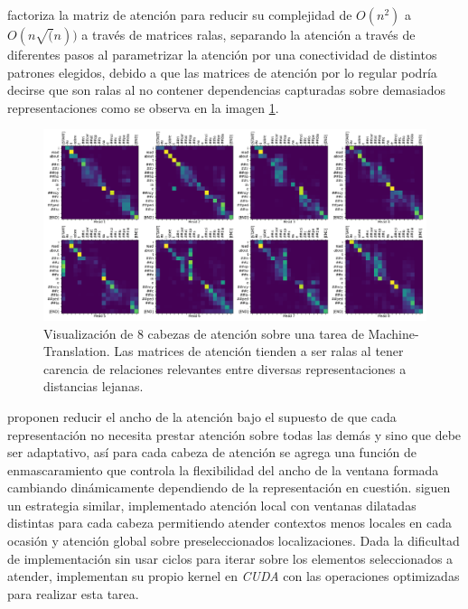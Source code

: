 \citeauthor*{DBLP:journals/corr/abs-1904-10509} factoriza la matriz de atención para reducir su complejidad
de $O(n^2)$ a $O(n\sqrt(n))$ a través de matrices ralas, separando la atención a través de diferentes
pasos al parametrizar la atención por una conectividad de distintos patrones elegidos, debido a que
las matrices de atención por lo regular podría decirse que son ralas al no contener dependencias
capturadas sobre demasiados representaciones como se observa en la imagen \ref{fig:att-spar}.

\begin{figure}[ht!]
    \centering
    \includegraphics[width=0.7 \textwidth]{Chapters/1. Transformer/Figures/transformer/head_sparsity.png}
    \caption{Visualización de 8 cabezas de atención sobre una tarea de Machine-Translation. Las
    matrices de atención tienden a ser ralas al tener carencia de relaciones relevantes entre diversas
    representaciones a distancias lejanas.}
    \label{fig:att-spar}
\end{figure}

\citeauthor*{DBLP:journals/corr/abs-1905-07799} proponen reducir el ancho de la atención bajo el supuesto
de que cada representación no necesita prestar atención sobre todas las demás y sino que debe ser
adaptativo, así para cada cabeza de atención se agrega una función de enmascaramiento que controla
la flexibilidad del ancho de la ventana formada cambiando dinámicamente dependiendo de la representación
en cuestión. \citeauthor*{DBLP:journals/corr/abs-2004-05150} siguen un estrategia similar, implementado
atención local con ventanas dilatadas distintas para cada cabeza permitiendo atender contextos menos
locales en cada ocasión y atención global sobre preseleccionados localizaciones. Dada la dificultad de
implementación sin usar ciclos para iterar sobre los elementos seleccionados a atender, implementan
su propio kernel en \textit{CUDA} con las operaciones optimizadas para realizar esta tarea.

